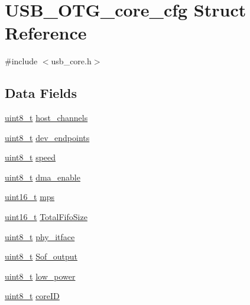 \hypertarget{struct_u_s_b___o_t_g__core__cfg}{\section{U\-S\-B\-\_\-\-O\-T\-G\-\_\-core\-\_\-cfg Struct Reference}
\label{struct_u_s_b___o_t_g__core__cfg}
}


{\ttfamily \#include $<$usb\-\_\-core.\-h$>$}

\subsection*{Data Fields}
\begin{DoxyCompactItemize}
\item 
\hyperlink{stdint_8h_aba7bc1797add20fe3efdf37ced1182c5}{uint8\-\_\-t} \hyperlink{struct_u_s_b___o_t_g__core__cfg_ac8f7d81fd5b4d38828bbed6a7a6bb350}{host\-\_\-channels}
\item 
\hyperlink{stdint_8h_aba7bc1797add20fe3efdf37ced1182c5}{uint8\-\_\-t} \hyperlink{struct_u_s_b___o_t_g__core__cfg_a2e2aa3e74ba77db957b2cf7f6f02c62d}{dev\-\_\-endpoints}
\item 
\hyperlink{stdint_8h_aba7bc1797add20fe3efdf37ced1182c5}{uint8\-\_\-t} \hyperlink{struct_u_s_b___o_t_g__core__cfg_a7f36c12839332633da8825c36773c36e}{speed}
\item 
\hyperlink{stdint_8h_aba7bc1797add20fe3efdf37ced1182c5}{uint8\-\_\-t} \hyperlink{struct_u_s_b___o_t_g__core__cfg_a568dd87637f670b9fd706f97fecea476}{dma\-\_\-enable}
\item 
\hyperlink{stdint_8h_a273cf69d639a59973b6019625df33e30}{uint16\-\_\-t} \hyperlink{struct_u_s_b___o_t_g__core__cfg_a02b0cfc0fde1fd37e24f00cd98580fdc}{mps}
\item 
\hyperlink{stdint_8h_a273cf69d639a59973b6019625df33e30}{uint16\-\_\-t} \hyperlink{struct_u_s_b___o_t_g__core__cfg_ac700e2573c4113d9e5f934b01ef36e2e}{Total\-Fifo\-Size}
\item 
\hyperlink{stdint_8h_aba7bc1797add20fe3efdf37ced1182c5}{uint8\-\_\-t} \hyperlink{struct_u_s_b___o_t_g__core__cfg_a445a98eff3b50a35adf8a255c3b3ef54}{phy\-\_\-itface}
\item 
\hyperlink{stdint_8h_aba7bc1797add20fe3efdf37ced1182c5}{uint8\-\_\-t} \hyperlink{struct_u_s_b___o_t_g__core__cfg_aaca3fc3f8d72b1fa9b8bf93200a82699}{Sof\-\_\-output}
\item 
\hyperlink{stdint_8h_aba7bc1797add20fe3efdf37ced1182c5}{uint8\-\_\-t} \hyperlink{struct_u_s_b___o_t_g__core__cfg_a215bf00bd42b18f4a76c514b298a09ce}{low\-\_\-power}
\item 
\hyperlink{stdint_8h_aba7bc1797add20fe3efdf37ced1182c5}{uint8\-\_\-t} \hyperlink{struct_u_s_b___o_t_g__core__cfg_ab07e7b932e93878ff201ea917db818b9}{core\-I\-D}
\end{DoxyCompactItemize}


